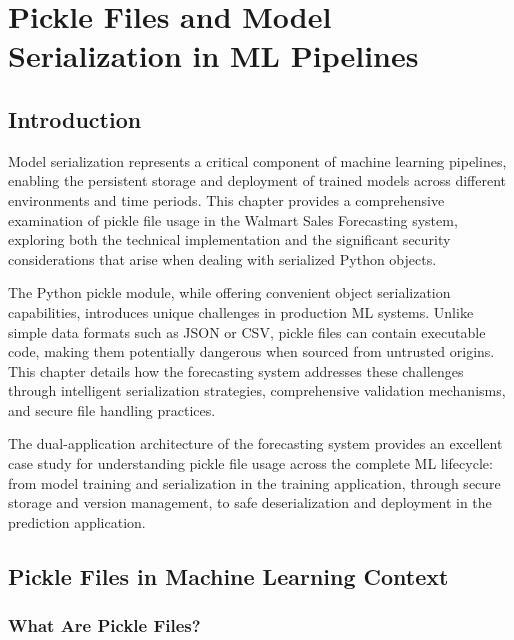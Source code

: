 %
%
%

\chapter{Pickle Files and Model Serialization in ML Pipelines}

\section{Introduction}

Model serialization represents a critical component of machine learning pipelines, enabling the persistent storage and deployment of trained models across different environments and time periods. This chapter provides a comprehensive examination of pickle file usage in the Walmart Sales Forecasting system, exploring both the technical implementation and the significant security considerations that arise when dealing with serialized Python objects.

The Python pickle module, while offering convenient object serialization capabilities, introduces unique challenges in production ML systems. Unlike simple data formats such as JSON or CSV, pickle files can contain executable code, making them potentially dangerous when sourced from untrusted origins. This chapter details how the forecasting system addresses these challenges through intelligent serialization strategies, comprehensive validation mechanisms, and secure file handling practices.

The dual-application architecture of the forecasting system provides an excellent case study for understanding pickle file usage across the complete ML lifecycle: from model training and serialization in the training application, through secure storage and version management, to safe deserialization and deployment in the prediction application.

\section{Pickle Files in Machine Learning Context}

\subsection{What Are Pickle Files?}

